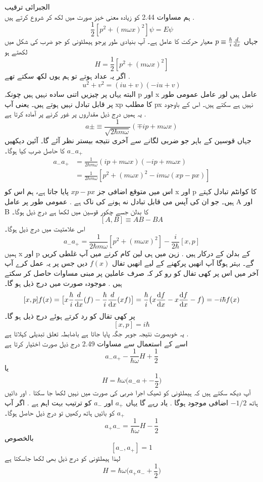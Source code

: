 \documentclass{book}
\begin{document}
الجبرائی ترقیب \\
ہم مساوات 
2.44
کو زیادہ معنی خیز صورت میں لکھ کر شروع کرتے ہیں .
\[\frac{1}{2}[p^{2}+(m\omega x)^{2}]\psi=E\psi\]
جہاں
\(p\equiv \frac{\hbar}{i}\frac{d}{\dif{x}}\)
معیار حرکت کا عامل ہے۔ آپ بنیادی طور پرجو ہیملٹونی کو جو ضرب کی شکل میں لکھتے ہو
\[H=\frac{1}{2}[p^{2}+(m\omega x)^{2}]\]
اگر یہ عداد ہوتے تو ہم یوں لکھ سکتے تھے .
\[u^{2}+v^{2}=(iu+v)(-iu+v)\]
البته یہاں پر چیزیں اتنی ساده نہیں ہیں چونکہ
p
اور
x
عامل ہیں لور عامل عمومی طور پر قابل تبادل نہیں ہوتے ہیں۔ یعنی آپ
xp
کا مطلب
px
نہیں ہے سکتے ہیں۔ اس کے باوجود یہ ہمیں درج ذیل مقداروں پر غور کرنے پر آمادہ کرتا ہے .
\[a\pm\equiv \frac{1}{\sqrt{2\hbar m\omega}}(\mp ip+m\omega x)\]
جہاں قوسین کے باہر جو ضربی لگانے سے آخری نتیجه بیستر نظر آئے گا۔
آئین دیکھیں
\(a_{-}a_{+}\)
کا حاصل ضرب کیا ہوگا۔\\
\begin{align*}
a_{-}a_{+}&=\frac{1}{2\hbar m\omega}(ip+m\omega x)(-ip+m\omega x)\\
&=\frac{1}{2\hbar m\omega}[p^{2}+(m\omega x)^{2}-im\omega(xp-px)]\\
\end{align*}
اس میں متوقع اضافی جز
\(xp-px\)
پایا جاتا ہے، ہم اس کو
x
اور
p
کا کوانٹم تبادل کہتے ہیں۔ جو ان کی آپس می قابل تبادل نه ہونے کی ناک ہے . عمومی طور پر عامل
A
اور
B
کا بدلن جسے چکور قوسین میں لکھا ہے درج ذیل ہوگا۔
\[[A,B]\equiv AB-BA\]
اس علامتیت میں درج ذیل ہوگا۔
\[a_{-}a_{+}=\frac{1}{2\hbar m\omega}[p^{2}+(m\omega x)^{2}]-\frac{i}{2\hbar}[x,p]\]
ہمیں
x
اور
p
کے بدلن کے درکار ہیں . زہن میں ہی لین کام کرنے میں آپ غلطی کریں گے۔ بہتر ہوگا آپ انھیں پرکھنے کے لیے انھیں تفال
\(f(x)\)
دیں جس پر یہ عمل کرے آپ آخر میں اس پر کھی تفال کو رو کر کہ صرف عاملین پر مبنی مساوات حاصل کر سکتے ہیں . موجودہ صورت میں درج ذیل ہو گا۔
\[[x,p]f(x)=\big[x\frac{\hbar}{i}\frac{d}{\dif{x}}(f)-\frac{\hbar}{i}\frac{d}{\dif{x}}(xf)\big ]=\frac{\hbar}{i}\big (x\frac{\dif{f}}{\dif{x}}-x\frac{\dif{f}}{\dif{x}}-f\big )=-i\hbar f(x)\]
پر کھی تقال کو رد کرتے ہوئے درج ذیل ہو گا۔
\[[x,p]=i\hbar\]
یہ خوبصورت نتیجہ جوہر جگہ پایا جاتا ہے باضابطہ تعلق تبدیلی کہلاتا ہے .\\
اسے کے استعمال سے مساوات
2.49
درج ذیل صورت اختيار کرتا ہے 
\[a_{-}a_{+}-\frac{1}{\hbar\omega}H+\frac{1}{2}\]
یا
\[H=\hbar\omega\big (a_{-}a{+}-\frac{1}{2} \big )\]
آپ دیکھ سکتے ہیں کہ ہیملٹونی کو ٹھیک اجرا ضربی کی صورت میں نہیں لكھا جا سکتا . اور دائیں ہاتھ 
\(-1/2\)
اضافی موجود ہوگا . یاد رہے گا یہاں 
\(a_{+}\)
اور
\(a_{-}\)
کو ترتیب بہت اہم ہے . اگر آپ
\(a_{+}\)
کو بائیں ہاتھ رکھیں تو درج ذیل حاصل ہوگا۔
\[a_{+}a_{-}=\frac{1}{\hbar\omega}H-\frac{1}{2}\]
بالخصوص
\[[a_{-},a_{+}]=1\]
لہذا ہیملٹونی کو درج ذیل بھی لکھا جاسکتا ہے
\[H=\hbar\omega\big (a_{+}a_{-}+\frac{1}{2}\big )\]
\end{document}
